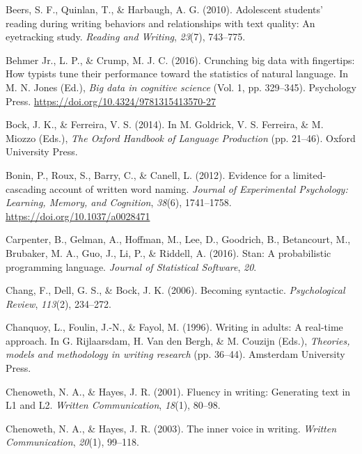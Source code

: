 \documentclass[
  man,floatsintext]{apa7}
\newlength{\cslhangindent}
\newlength{\cslentryspacingunit} %
\newenvironment{CSLReferences}[2] %
 {%
  \setlength{\parindent}{0pt}
  \ifodd #1
  \let\oldpar\par
  \def\par{\hangindent=\cslhangindent\oldpar}
  \fi
  \setlength{\parskip}{#2\cslentryspacingunit}
 }%
 {}
\begin{document}
\begin{CSLReferences}{1}{0}
\leavevmode{}%
Beers, S. F., Quinlan, T., \& Harbaugh, A. G. (2010). Adolescent students' reading during writing behaviors and relationships with text quality: An eyetracking study. \emph{Reading and Writing}, \emph{23}(7), 743--775.

\leavevmode{}%
Behmer Jr., L. P., \& Crump, M. J. C. (2016). Crunching big data with fingertips: How typists tune their performance toward the statistics of natural language. In M. N. Jones (Ed.), \emph{Big data in cognitive science} (Vol. 1, pp. 329--345). Psychology Press. \url{https://doi.org/10.4324/9781315413570-27}

\leavevmode{}%
Bock, J. K., \& Ferreira, V. S. (2014). In M. Goldrick, V. S. Ferreira, \& M. Miozzo (Eds.), \emph{{The Oxford Handbook of Language Production}} (pp. 21--46). Oxford University Press.

\leavevmode{}%
Bonin, P., Roux, S., Barry, C., \& Canell, L. (2012). Evidence for a limited-cascading account of written word naming. \emph{Journal of Experimental Psychology: Learning, Memory, and Cognition}, \emph{38}(6), 1741--1758. \url{https://doi.org/10.1037/a0028471}

\leavevmode{}%
Carpenter, B., Gelman, A., Hoffman, M., Lee, D., Goodrich, B., Betancourt, M., Brubaker, M. A., Guo, J., Li, P., \& Riddell, A. (2016). Stan: A probabilistic programming language. \emph{Journal of Statistical Software}, \emph{20}.

\leavevmode{}%
Chang, F., Dell, G. S., \& Bock, J. K. (2006). Becoming syntactic. \emph{Psychological Review}, \emph{113}(2), 234--272.

\leavevmode{}%
Chanquoy, L., Foulin, J.-N., \& Fayol, M. (1996). Writing in adults: {A} real-time approach. In G. Rijlaarsdam, H. Van den Bergh, \& M. Couzijn (Eds.), \emph{Theories, models and methodology in writing research} (pp. 36--44). Amsterdam University Press.

\leavevmode{}%
Chenoweth, N. A., \& Hayes, J. R. (2001). Fluency in writing: Generating text in {L1} and {L2}. \emph{Written Communication}, \emph{18}(1), 80--98.

\leavevmode{}%
Chenoweth, N. A., \& Hayes, J. R. (2003). The inner voice in writing. \emph{Written Communication}, \emph{20}(1), 99--118.


\end{CSLReferences}
\end{document}
